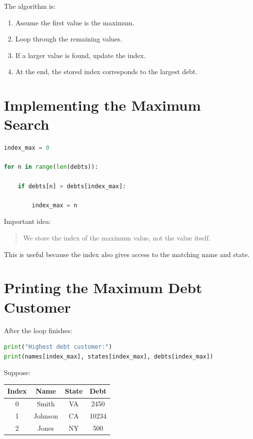 \documentclass[11pt]{article}
\begin{document}
The algorithm is:

\begin{enumerate}
    \item Assume the first value is the maximum.
    \item Loop through the remaining values.
    \item If a larger value is found, update the index.
    \item At the end, the stored index corresponds to the largest debt.
\end{enumerate}

\section{Implementing the Maximum Search}

\begin{lstlisting}[language=Python]
index_max = 0

for n in range(len(debts)):

    if debts[n] > debts[index_max]:

        index_max = n
\end{lstlisting}

Important idea:

\begin{quote}
We store the index of the maximum value, not the value itself.
\end{quote}

This is useful because the index also gives access to the matching name and state.

\section{Printing the Maximum Debt Customer}

After the loop finishes:

\begin{lstlisting}[language=Python]
print("Highest debt customer:")
print(names[index_max], states[index_max], debts[index_max])
\end{lstlisting}

Suppose:

\begin{center}
\begin{tabular}{cccc}
\toprule
Index & Name & State & Debt \\
\midrule
0 & Smith & VA & 2450 \\
1 & Johnson & CA & 10234 \\
2 & Jones & NY & 500 \\
\bottomrule
\end{tabular}
\end{center}
\end{document}
